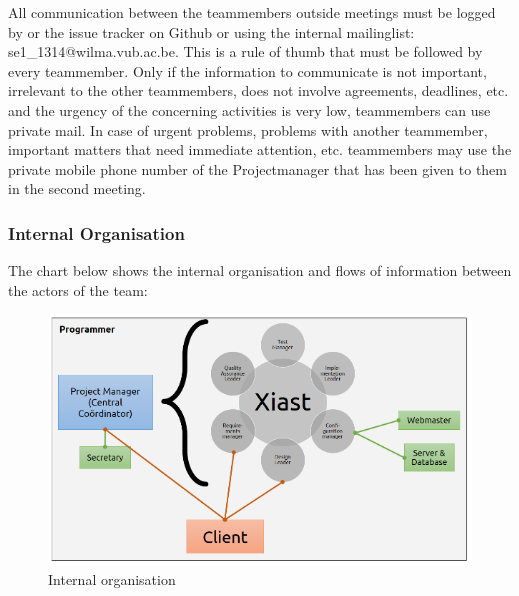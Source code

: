\documentclass[12pt]{article}
\begin{document}
All communication between the teammembers outside meetings must be
logged by or the issue tracker on Github or using the
internal mailinglist: se1\_1314@wilma.vub.ac.be. This is a rule of thumb
that must be followed by every teammember. Only if the information to
communicate is not important, irrelevant to the other teammembers, does
not involve agreements, deadlines, etc. and the urgency of the
concerning activities is very low, teammembers can use private mail. In
case of urgent problems, problems with another teammember, important
matters that need immediate attention, etc. teammembers may use the
private mobile phone number of the
Projectmanager that has been given to them in
the second meeting.

\subsubsection{Internal Organisation}\label{internal-organisation}

The chart below shows the internal organisation and flows of information
between the actors of the team:

\begin{figure}
\includegraphics[width=400pt]{organisation.png}
\caption{Internal organisation}
\end{figure}
\end{document}

